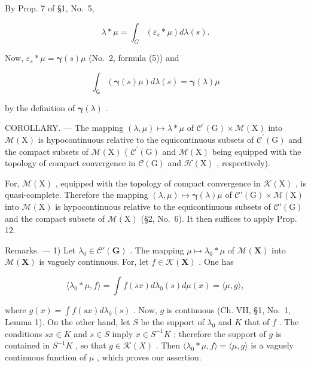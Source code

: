 By Prop. 7 of §1, No.~5,

\[
\lambda * \mu = \int_ {G} (\varepsilon_ {s} * \mu) d \lambda (s).
\]

Now, \(\varepsilon_{s}*\mu = \pmb {\gamma}(s)\mu\) (No.~2, formula (5)) and

\[
\int_ {\mathsf {G}} \left(\pmb {\gamma} (s) \mu\right) d \lambda (s) = \pmb {\gamma} (\lambda) \mu
\]

by the definition of \(\pmb{\gamma}(\lambda)\) .

COROLLARY. --- The mapping \((\lambda,\mu)\mapsto\lambda*\mu\) of \(\mathcal{C}^{\prime}(\mathrm{G})\times\mathcal{M}(\mathrm{X})\) into \(\mathcal{M}(\mathrm{X})\) is hypocontinuous relative to the equicontinuous subsets of \(\mathcal{C}^{\prime}(\mathrm{G})\) and the compact subsets of \(\mathcal{M}(\mathrm{X})\) ( \(\mathcal{C}^{\prime}(\mathrm{G})\) and \(\mathcal{M}(\mathrm{X})\) being equipped with the topology of compact convergence in \(\mathcal{C}(\mathrm{G})\) and \(\mathcal{H}(\mathrm{X})\) , respectively).

For, \(\mathcal{M}(\mathrm{X})\) , equipped with the topology of compact convergence in \(\mathcal{K}(\mathrm{X})\) , is quasi-complete. Therefore the mapping \((\lambda, \mu) \mapsto \pmb{\gamma}(\lambda)\mu\) of \(\mathcal{C}'(\mathrm{G}) \times \mathcal{M}(\mathrm{X})\) into \(\mathcal{M}(\mathrm{X})\) is hypocontinuous relative to the equicontinuous subsets of \(\mathcal{C}'(\mathrm{G})\) and the compact subsets of \(\mathcal{M}(\mathrm{X})\) (§2, No.~6). It then suffices to apply Prop. 12.

Remarks. --- 1) Let \(\lambda_0 \in \mathcal{C}'(\mathbf{G})\) . The mapping \(\mu \mapsto \lambda_0 * \mu\) of \(\mathcal{M}(\mathbf{X})\) into \(\mathcal{M}(\mathbf{X})\) is vaguely continuous. For, let \(f \in \mathcal{K}(\mathbf{X})\) . One has

\[
\langle \lambda_ {0} * \mu , f \rangle = \int f (s x) d \lambda_ {0} (s) d \mu (x) = \langle \mu , g \rangle ,
\]

where \(g(x) = \int f(sx) d\lambda_0(s)\) . Now, \(g\) is continuous (Ch. VII, §1, No.~1, Lemma 1). On the other hand, let \(S\) be the support of \(\lambda_0\) and \(K\) that of \(f\) . The conditions \(sx \in K\) and \(s \in S\) imply \(x \in S^{-1}K\) ; therefore the support of \(g\) is contained in \(S^{-1}K\) , so that \(g \in \mathcal{K}(X)\) . Then \(\langle \lambda_0 * \mu, f \rangle = \langle \mu, g \rangle\) is a vaguely continuous function of \(\mu\) , which proves our assertion.

